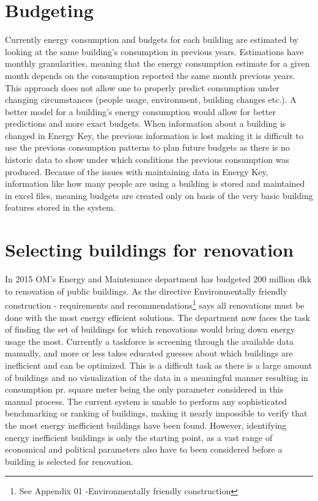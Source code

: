  \section*{Budgeting}
 Currently energy consumption and budgets for each building are estimated by looking at the same building’s consumption in previous years. Estimations have monthly granularities, meaning that the energy consumption estimate for a given month depends on the consumption reported the same month previous years. This approach does not allow one to properly predict consumption under changing circumstances (people usage, environment, building changes etc.). A better model for a building’s energy consumption would allow for better predictions and more exact budgets. When information about a building is changed in Energy Key, the previous information is lost making it is difficult to use the previous consumption patterns to plan future budgets as there is no historic data to show under which conditions the previous consumption was produced. Because of the issues with maintaining data in Energy Key, information like how many people are using a building is stored and maintained in excel files, meaning budgets are created only on basis of the very basic building features stored in the system.
 \section*{Selecting buildings for renovation}
 In 2015 OM’s Energy and Maintenance department has budgeted 200 million dkk to renovation of public buildings. As the directive Environmentally friendly construction - requirements and recommendations\footnote{See Appendix 01 -Environmentally friendly construction} says all renovations must be done with the most energy efficient solutions. The department now faces the task of finding the set of buildings for which renovations would bring down energy usage the most. Currently a taskforce is screening through the available data manually, and more or less takes educated guesses about which buildings are inefficient and can be optimized. This is a difficult task as there is a large amount of buildings and no visualization of the data in a meaningful manner resulting in consumption pr. square meter being the only parameter considered in this manual process. The current system is unable to perform any sophisticated benchmarking or ranking of buildings, making it nearly impossible to verify that the most energy inefficient buildings have been found. However, identifying energy inefficient buildings is only the starting point, as a vast range of economical and political parameters also have to been considered before a building is selected for renovation.